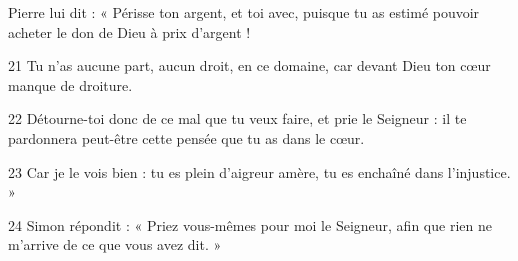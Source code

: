 Pierre lui dit : « Périsse ton argent, et toi avec, puisque tu as estimé pouvoir acheter le don de Dieu à prix d’argent !

21 Tu n’as aucune part, aucun droit, en ce domaine, car devant Dieu ton cœur manque de droiture.

22 Détourne-toi donc de ce mal que tu veux faire, et prie le Seigneur : il te pardonnera peut-être cette pensée que tu as dans le cœur.

23 Car je le vois bien : tu es plein d’aigreur amère, tu es enchaîné dans l’injustice. »

24 Simon répondit : « Priez vous-mêmes pour moi le Seigneur, afin que rien ne m’arrive de ce que vous avez dit. »